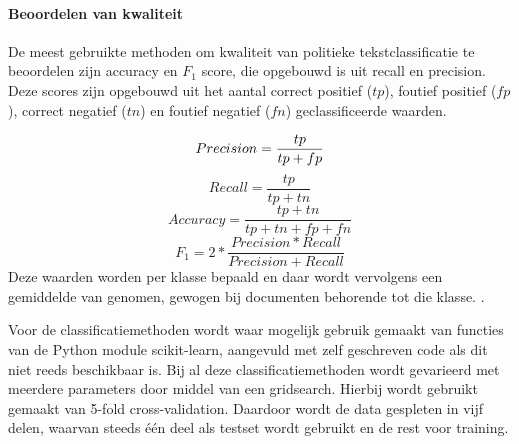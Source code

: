 \paragraph{Beoordelen van kwaliteit}
De meest gebruikte methoden om kwaliteit van politieke tekstclassificatie te beoordelen zijn accuracy en $F_1$ score, die opgebouwd is uit recall en precision. Deze scores zijn opgebouwd uit het aantal correct positief ($tp$), foutief positief ($fp$), correct negatief ($tn$) en foutief negatief ($fn$) geclassificeerde waarden.\par
\begin{equation}
    Precision = \frac{tp}{tp + fp}\\
\end{equation}
\begin{equation}
    Recall = \frac{tp}{tp + tn}
\end{equation}
\begin{equation}
    Accuracy = \frac{tp + tn}{tp + tn + fp + fn}
\end{equation}
\begin{equation}
    F_1 = 2 * \frac{Precision * Recall}{Precision + Recall}
\end{equation}
Deze waarden worden per klasse bepaald en daar wordt vervolgens een gemiddelde van genomen, gewogen bij documenten behorende tot die klasse.  \cite{Manning:2008:IIR:1394399,scikit-learn}.\par
\bigskip
Voor de classificatiemethoden wordt waar mogelijk gebruik gemaakt van functies van de Python module scikit-learn\cite{scikit-learn}, aangevuld met zelf geschreven code als dit niet reeds beschikbaar is. Bij al deze classificatiemethoden wordt gevarieerd met meerdere parameters door middel van een gridsearch. Hierbij wordt gebruikt gemaakt van 5-fold cross-validation. Daardoor wordt de data gespleten in vijf delen, waarvan steeds één deel als testset wordt gebruikt en de rest voor training.

